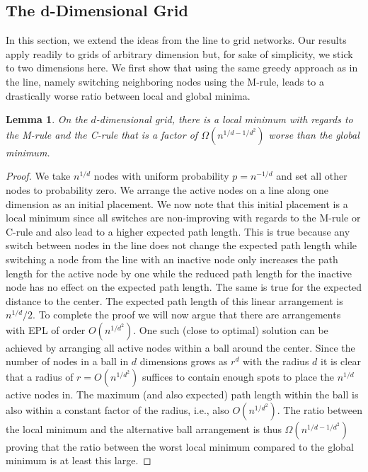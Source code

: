 \documentclass[conference]{IEEEtran}
\newtheorem{lemma}{Lemma}
\begin{document}
\subsection{The d-Dimensional Grid}

In this section, we extend the ideas from the line to grid networks. Our results apply readily to grids of arbitrary dimension but, for sake of simplicity, we stick to two dimensions here.
We first show that using the same greedy approach as in the line, namely switching neighboring nodes using the M-rule, leads to a drastically worse ratio between local and global minima.

\begin{lemma}
On the $d$-dimensional grid, there is a local minimum with regards to the M-rule and the C-rule that is a factor of $\Omega(n^{1/d - 1/d^2})$ worse than the global minimum.
\end{lemma}
\begin{proof}
We take $n^{1/d}$ nodes with uniform probability $p = n^{-1/d}$ and set all other nodes to probability zero. We arrange the active nodes on a line along one dimension as an initial placement. We now note that this initial placement is a local minimum since all switches are non-improving with regards to the M-rule or C-rule and also lead to a higher expected path length. This is true because any switch between nodes in the line does not change the expected path length while switching a node from the line with an inactive node only increases the path length for the active node by one while the reduced path length for the inactive node has no effect on the expected path length. The same is true for the expected distance to the center. The expected path length of this linear arrangement is $n^{1/d}/2$. To complete the proof we will now argue that there are arrangements with EPL of order $O(n^{1/d^2})$. One such (close to optimal) solution can be achieved by arranging all active nodes within a ball around the center. Since the number of nodes in a ball in $d$ dimensions grows as $r^d$ with the radius $d$ it is clear that a radius of $r = O(n^{1/d^2})$ suffices to contain enough spots to place the $n^{1/d}$ active nodes in. The maximum (and also expected) path length within the ball is also within a constant factor of the radius, i.e., also $O(n^{1/d^2})$. The ratio between the local minimum and the alternative ball arrangement is thus $\Omega(n^{1/d - 1/d^2})$ proving that the ratio between the worst local minimum compared to the global minimum is at least this large. 
\end{proof}
\end{document}
